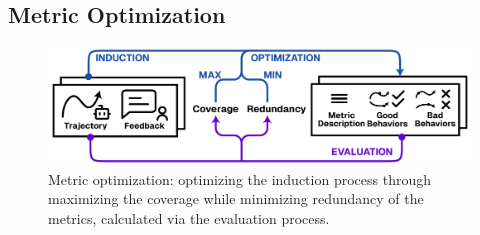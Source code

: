 \subsection{Metric Optimization}
\label{sec:metric-optimization}

\begin{figure}[!t]
    \centering
    \includegraphics[width=0.8\linewidth]{figs/autolibra_optimization.pdf}
    \caption{Metric optimization: optimizing the induction process through maximizing the coverage while minimizing redundancy of the metrics, calculated via the evaluation process.}
    \label{fig:autolibra_optimization}
\end{figure}


